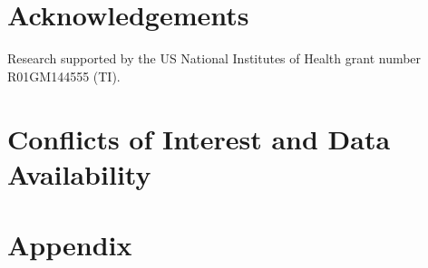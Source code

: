 \documentclass[iucr]{iucrjournals}
\begin{document}


\section*{Acknowledgements}
Research supported by the US National Institutes of Health grant number R01GM144555 (TI).

\section*{Conflicts of Interest and Data Availability} 





\section*{Appendix}
\appendix

\end{document}
